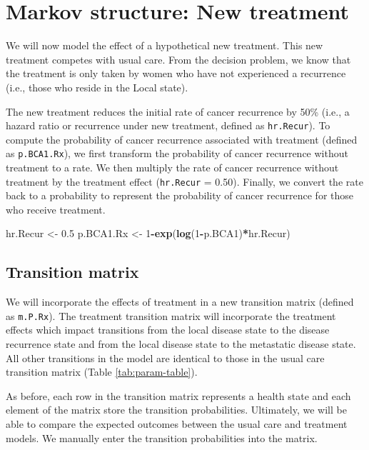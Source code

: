 \documentclass[]{article}
\newenvironment{Shaded}{\begin{snugshade}}{\end{snugshade}}
\newcommand{\KeywordTok}[1]{\textcolor[rgb]{0.13,0.29,0.53}{\textbf{#1}}}
\newcommand{\DecValTok}[1]{\textcolor[rgb]{0.00,0.00,0.81}{#1}}
\newcommand{\FloatTok}[1]{\textcolor[rgb]{0.00,0.00,0.81}{#1}}
\newcommand{\StringTok}[1]{\textcolor[rgb]{0.31,0.60,0.02}{#1}}
\newcommand{\OperatorTok}[1]{\textcolor[rgb]{0.81,0.36,0.00}{\textbf{#1}}}
\newcommand{\NormalTok}[1]{#1}
\theoremstyle{definition}
\theoremstyle{definition}
\theoremstyle{definition}
\theoremstyle{remark}
\begin{document}
\section{Markov structure: New
treatment}\label{markov-structure-new-treatment}

We will now model the effect of a hypothetical new treatment. This new
treatment competes with usual care. From the decision problem, we know
that the treatment is only taken by women who have not experienced a
recurrence (i.e., those who reside in the Local state).

The new treatment reduces the initial rate of cancer recurrence by 50\%
(i.e., a hazard ratio or recurrence under new treatment, defined as
\texttt{hr.Recur}). To compute the probability of cancer recurrence
associated with treatment (defined as \texttt{p.BCA1.Rx}), we first
transform the probability of cancer recurrence without treatment to a
rate. We then multiply the rate of cancer recurrence without treatment
by the treatment effect (\texttt{hr.Recur} = 0.50). Finally, we convert
the rate back to a probability to represent the probability of cancer
recurrence for those who receive treatment.

\begin{Shaded}
\begin{Highlighting}[]
\NormalTok{hr.Recur   <-}\StringTok{ }\FloatTok{0.5}
\NormalTok{p.BCA1.Rx  <-}\StringTok{ }\DecValTok{1}\OperatorTok{-}\KeywordTok{exp}\NormalTok{(}\KeywordTok{log}\NormalTok{(}\DecValTok{1}\OperatorTok{-}\NormalTok{p.BCA1)}\OperatorTok{*}\NormalTok{hr.Recur)}
\end{Highlighting}
\end{Shaded}

\subsection{Transition matrix}\label{transition-matrix-1}

We will incorporate the effects of treatment in a new transition matrix
(defined as \texttt{m.P.Rx}). The treatment transition matrix will
incorporate the treatment effects which impact transitions from the
local disease state to the disease recurrence state and from the local
disease state to the metastatic disease state. All other transitions in
the model are identical to those in the usual care transition matrix
(Table \ref{tab:param-table}).

As before, each row in the transition matrix represents a health state
and each element of the matrix store the transition probabilities.
Ultimately, we will be able to compare the expected outcomes between the
usual care and treatment models. We manually enter the transition
probabilities into the matrix.
\end{document}
